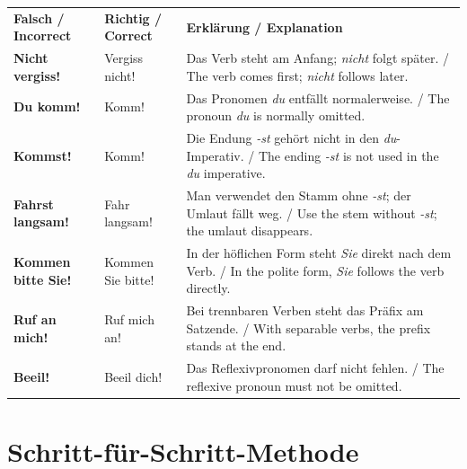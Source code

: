 \documentclass[a4paper,11pt]{article}
\begin{document}
        \begin{longtable}{>{\bfseries}p{4.2cm}|p{4.4cm}|p{6cm}}
            \rowcolor{HeaderBlueDark}
            \color{white}\textbf{Falsch / Incorrect} &
            \color{white}\textbf{Richtig / Correct} &
            \color{white}\textbf{Erklärung / Explanation} \\
            Nicht vergiss! & Vergiss nicht! & Das Verb steht am Anfang; \textit{nicht} folgt später. / The verb comes first; \textit{nicht} follows later. \\
            Du komm! & Komm! & Das Pronomen \textit{du} entfällt normalerweise. / The pronoun \textit{du} is normally omitted. \\
            Kommst! & Komm! & Die Endung \textit{-st} gehört nicht in den \textit{du}-Imperativ. / The ending \textit{-st} is not used in the \textit{du} imperative. \\
            Fahrst langsam! & Fahr langsam! & Man verwendet den Stamm ohne \textit{-st}; der Umlaut fällt weg. / Use the stem without \textit{-st}; the umlaut disappears. \\
            Kommen bitte Sie! & Kommen Sie bitte! & In der höflichen Form steht \textit{Sie} direkt nach dem Verb. / In the polite form, \textit{Sie} follows the verb directly. \\
            Ruf an mich! & Ruf mich an! & Bei trennbaren Verben steht das Präfix am Satzende. / With separable verbs, the prefix stands at the end. \\
            Beeil! & Beeil dich! & Das Reflexivpronomen darf nicht fehlen. / The reflexive pronoun must not be omitted. \\
        \end{longtable}

    \section{Schritt-für-Schritt-Methode}
\end{document}
